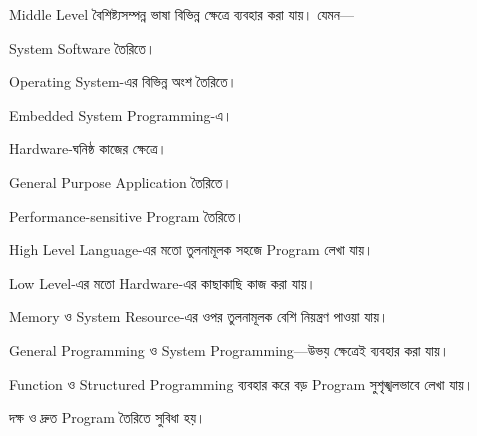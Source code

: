 
Middle Level বৈশিষ্ট্যসম্পন্ন ভাষা বিভিন্ন ক্ষেত্রে ব্যবহার করা যায়।
যেমন—

\begin{compacttwocolpoints}

\item System Software তৈরিতে।

\item Operating System-এর বিভিন্ন অংশ তৈরিতে।

\item Embedded System Programming-এ।

\item Hardware-ঘনিষ্ঠ কাজের ক্ষেত্রে।

\item General Purpose Application তৈরিতে।

\item Performance-sensitive Program তৈরিতে।

\end{compacttwocolpoints}


\begin{compacttwocolpoints}

\item High Level Language-এর মতো তুলনামূলক সহজে Program লেখা যায়।

\item Low Level-এর মতো Hardware-এর কাছাকাছি কাজ করা যায়।

\item Memory ও System Resource-এর ওপর তুলনামূলক বেশি নিয়ন্ত্রণ পাওয়া যায়।

\item General Programming ও System Programming—উভয় ক্ষেত্রেই
ব্যবহার করা যায়।

\item Function ও Structured Programming ব্যবহার করে বড় Program
সুশৃঙ্খলভাবে লেখা যায়।

\item দক্ষ ও দ্রুত Program তৈরিতে সুবিধা হয়।

\end{compacttwocolpoints}


